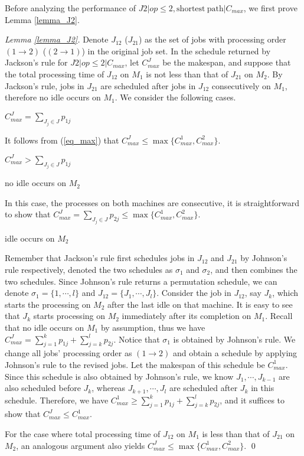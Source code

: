 \documentclass{llncs}
\numberwithin{subcase}{case}
\begin{document}
Before analyzing the performance of $J2|op\leq 2, \mathrm{shortest}~\mathrm{path}|C_{max}$, we first prove Lemma \ref{lemma_J2}.
\begin{proof}[Lemma \ref{lemma_J2}]
Denote $J_{12}$ ($J_{21}$) as the set of jobs with processing order $(1\rightarrow2)$ ($(2\rightarrow1)$) in the original job set. In the schedule returned by Jackson's rule for $J2|op \leq 2|C_{max}$, let $C^J_{max}$ be the makespan, and suppose that the total processing time of $J_{12}$ on $M_1$ is not less than that of $J_{21}$ on $M_2$. By  Jackson's rule, jobs in $J_{21}$ are scheduled after jobs in $J_{12}$ consecutively on $M_1$, therefore no idle occurs on $M_1$. We consider the following cases.
\setcounter{case}{0}
\begin{case}$C^J_{max} = \sum_{J_j \in J}p_{1j}$

It follows from (\ref{eq_max}) that $C^J_{max}\leq \max\{C^{1}_{max}, C^2_{max}\}$.
\end{case}

\begin{case}$C^J_{max} > \sum_{J_j \in J}p_{1j}$

\begin{subcase}{no idle occurs on $M_2$}

In this case, the processes on both machines are consecutive, it is straightforward to show that $C^J_{max} = \sum_{J_j \in J}p_{2j} \leq \max\{C^{1}_{max}, C^2_{max}\}.$
\end{subcase}
\begin{subcase}{idle occurs on $M_2$}

Remember that Jackson's rule first schedules jobs in $J_{12}$ and $J_{21}$ by Johnson's rule respectively, denoted the two schedules as $\sigma_1$ and $\sigma_2$, and then combines the two schedules. Since Johnson's rule returns a permutation schedule, we can denote $\sigma_1 = \{1, \cdots, l\}$ and $J_{12}=\{J_1, \cdots, J_l\}$. Consider the job in $J_{12}$, say $J_k$, which starts the processing on $M_2$ after the last idle on that machine. It is easy to see that $J_k$ starts processing on $M_2$ immediately after its completion on $M_1$. Recall that no idle occurs on $M_1$ by assumption, thus we have $C^J_{max} = \sum^k_{j = 1} p_{1j} + \sum^l_{j = k} p_{2j}$. Notice that $\sigma_1$ is obtained by Johnson's rule. We change all jobs' processing order as $(1\rightarrow2)$ and obtain a schedule by applying Johnson's rule to the revised jobs. Let the makespan of this schedule be $C^1_{max}$. Since this schedule is also obtained by Johnson's rule, we know $J_1, \cdots, J_{k-1}$ are also scheduled before $J_{k}$, whereas $J_{k+1}, \cdots, J_l$ are scheduled after $J_k$ in this schedule. Therefore, we have $C^1_{max} \geq \sum^k_{j = 1} p_{1j} + \sum^l_{j = k} p_{2j}$, and it suffices to show that $C^J_{max}\leq C^1_{max}$.
\end{subcase}
\end{case}

For the case where total processing time of $J_{12}$ on $M_1$ is less than that of $J_{21}$ on $M_2$, an analogous argument also yields $C^J_{max}\leq \max\{C^{1}_{max}, C^2_{max}\}$.
\qed
\end{proof}
\end{document}
